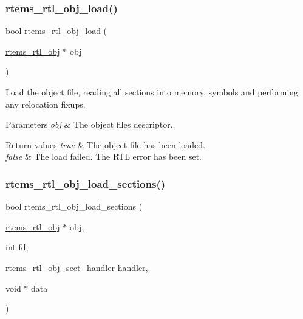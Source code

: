 \subsubsection{\texorpdfstring{rtems\_rtl\_obj\_load()}{rtems\_rtl\_obj\_load()}}
{\footnotesize\ttfamily bool rtems\+\_\+rtl\+\_\+obj\+\_\+load (\begin{DoxyParamCaption}\item[{\mbox{\hyperlink{structrtems__rtl__obj}{rtems\+\_\+rtl\+\_\+obj}} $\ast$}]{obj }\end{DoxyParamCaption})}

Load the object file, reading all sections into memory, symbols and performing any relocation fixups.


\begin{DoxyParams}{Parameters}
{\em obj} & The object file\textquotesingle{}s descriptor. \\
\hline
\end{DoxyParams}

\begin{DoxyRetVals}{Return values}
{\em true} & The object file has been loaded. \\
\hline
{\em false} & The load failed. The R\+TL error has been set. \\
\hline
\end{DoxyRetVals}
\mbox{\label{rtl-obj_8h_aac7c6817d06d317f301538bcf30ffa9f}} 
\subsubsection{\texorpdfstring{rtems\_rtl\_obj\_load\_sections()}{rtems\_rtl\_obj\_load\_sections()}}
{\footnotesize\ttfamily bool rtems\+\_\+rtl\+\_\+obj\+\_\+load\+\_\+sections (\begin{DoxyParamCaption}\item[{\mbox{\hyperlink{structrtems__rtl__obj}{rtems\+\_\+rtl\+\_\+obj}} $\ast$}]{obj,  }\item[{int}]{fd,  }\item[{\mbox{\hyperlink{rtl-obj_8h_a7af5827cf336da33eef4564a6e00ba11}{rtems\+\_\+rtl\+\_\+obj\+\_\+sect\+\_\+handler}}}]{handler,  }\item[{void $\ast$}]{data }\end{DoxyParamCaption})}

